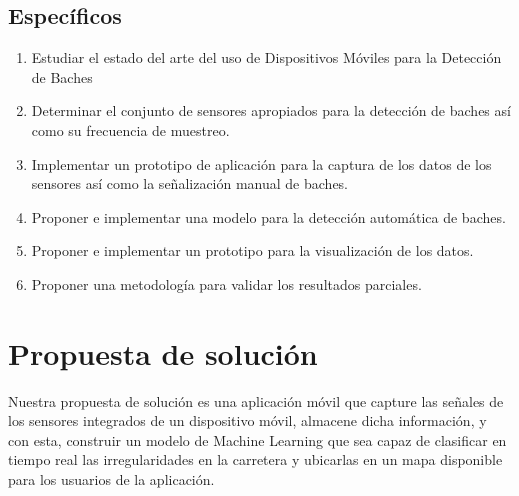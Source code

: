 \subsection*{Específicos}
\begin{enumerate}
		\item Estudiar el estado del arte del uso de Dispositivos Móviles para la Detección de Baches
		\item Determinar el conjunto de sensores apropiados para la detección de baches así como su 
frecuencia de muestreo. 
		\item Implementar un prototipo de aplicación para la captura de los datos de los sensores así 
como la señalización manual de baches. 
		\item Proponer e implementar una modelo para la detección automática de baches.
		\item Proponer e implementar un prototipo para la visualización de los datos.
		\item Proponer una metodología para validar los resultados parciales.

\end{enumerate}

\section*{Propuesta de solución}

Nuestra propuesta de solución es una aplicación móvil que capture las señales de los sensores integrados de un dispositivo móvil, almacene
dicha información, y con esta, construir un modelo de Machine Learning que sea capaz de clasificar en tiempo real las irregularidades en la
carretera y ubicarlas en un mapa disponible para los usuarios de la aplicación.
